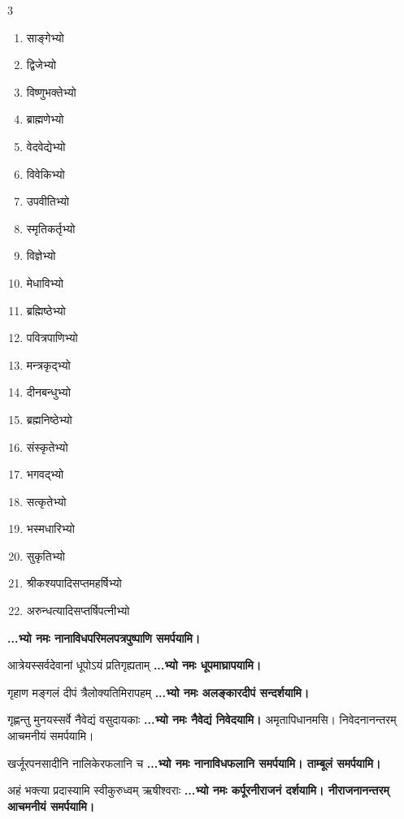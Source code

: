 \begin{multicols}{3}
\begin{enumerate}
\item साङ्गेभ्यो
\item द्विजेभ्यो
\item विष्णुभक्तेभ्यो
\item ब्राह्मणेभ्यो
\item वेदवेद्येभ्यो
\item विवेकिभ्यो
\item उपवीतिभ्यो
\item स्मृतिकर्तृभ्यो
\item विज्ञेभ्यो
\item मेधाविभ्यो
\item ब्रह्मिष्ठेभ्यो
\item पवित्रपाणिभ्यो
\item मन्त्रकृद्भ्यो
\item दीनबन्धुभ्यो
\item ब्रह्मनिष्ठेभ्यो
\item संस्कृतेभ्यो
\item भगवद्भ्यो
\item सत्कृतेभ्यो
\item भस्मधारिभ्यो
\item सुकृतिभ्यो
\item श्रीकश्यपादिसप्तमहर्षिभ्यो
\item अरुन्धत्यादिसप्तर्षिपत्नीभ्यो
\end{enumerate}
\end{multicols}
\textbf{...भ्यो नमः नानाविधपरिमलपत्रपुष्पाणि समर्पयामि।}

{आत्रेयस्सर्वदेवानां धूपोऽयं प्रतिगृह्यताम्}
\textbf{...भ्यो नमः धूपमाघ्रापयामि।}

{गृहाण मङ्गलं दीपं त्रैलोक्यतिमिरापहम्}
\textbf{...भ्यो नमः अलङ्कारदीपं सन्दर्शयामि।}

{गृह्णन्तु मुनयस्सर्वे नैवेद्यं वसुदायकाः}
\textbf{...भ्यो नमः नैवेद्यं निवेदयामि।}
अमृतापिधानमसि। निवेदनानन्तरम् आचमनीयं समर्पयामि।

{खर्जूरपनसादीनि नालिकेरफलानि च}
\textbf{...भ्यो नमः नानाविधफलानि समर्पयामि। ताम्बूलं समर्पयामि।}

{अहं भक्त्या प्रदास्यामि स्वीकुरुध्वम् ऋषीश्वराः}
\textbf{...भ्यो नमः कर्पूरनीराजनं दर्शयामि। नीराजनानन्तरम् आचमनीयं समर्पयामि।}


